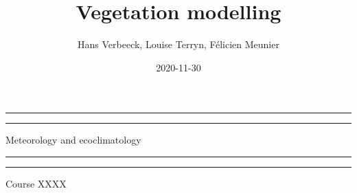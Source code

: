 \documentclass[oneside]{book}
\title{Vegetation modelling}
\author{Hans Verbeeck, Louise Terryn, Félicien Meunier}
\date{2020-11-30}
\begin{document}
\maketitle

\newcommand{\plogo}{\fbox{$\mathcal{PL}$}} %
\frontmatter


\begin{titlepage} %

	\centering %
	
	\scshape %
	
	\vspace*{\baselineskip} %
	
	
	\vspace{12\baselineskip}
	
	\rule{\textwidth}{1.6pt}\vspace*{-\baselineskip}\vspace*{2pt} %
	\rule{\textwidth}{0.4pt} %
	
	\vspace{0.75\baselineskip} %
	
	{\LARGE Meteorology and ecoclimatology\\} %
	
	\vspace{0.75\baselineskip} %
	
	\rule{\textwidth}{0.4pt}\vspace*{-\baselineskip}\vspace{3.2pt} %
	\rule{\textwidth}{1.6pt} %
	
	\vspace{2\baselineskip} %
	
	
	Course XXXX %
	
	\vspace*{3\baselineskip} %
	
	

\end{titlepage}
\end{document}
